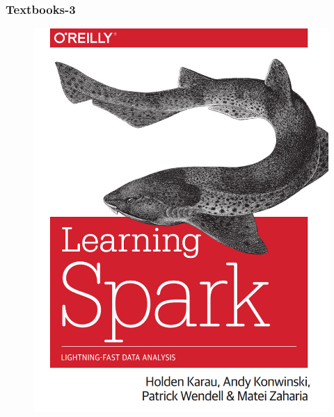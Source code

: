 \begin{frame}
\frametitle{Textbooks-3}

\begin{figure}[ht]
	\begin{minipage}[c][1\width]{
			0.3\textwidth}
		\centering
		\includegraphics[width=\linewidth]{./Figures/chapter-00/learning_spark_front.png}
	\end{minipage}
	\hfill	
	\begin{minipage}[c][1\width]{
			0.3\textwidth}
		\centering

\end{minipage}
\end{figure}
\end{frame}
